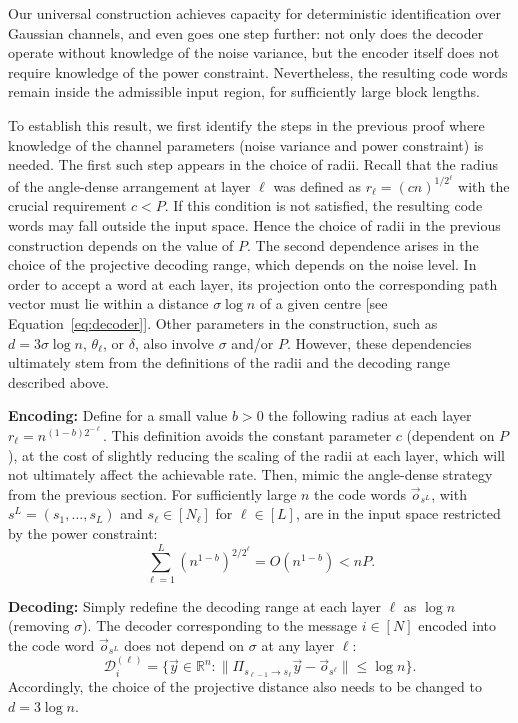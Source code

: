 \documentclass[10pt,conference]{IEEEtran}
\newcommand{\1}{\mathds{1}}
\newcommand{\RR}{\mathbb{R}}
\newcommand{\cD}{\mathcal{D}}
\begin{document}
Our universal construction achieves capacity for deterministic identification over Gaussian channels, and even goes one step further: not only does the decoder operate without knowledge of the noise variance, but the encoder itself does not require knowledge of the power constraint. Nevertheless, the resulting code words remain inside the admissible input region, for sufficiently large block lengths. 

To establish this result, we first identify the steps in the previous proof where knowledge of the channel parameters (noise variance and power constraint) is needed. The first such step appears in the choice of radii. Recall that the radius of the angle-dense arrangement at layer $\ell$ was defined as $r_\ell=(cn)^{1/2^\ell}$ with the crucial requirement $c<P$. If this condition is not satisfied, the resulting code words may fall outside the input space. Hence the choice of radii in the previous construction depends on the value of $P$. The second dependence arises in the choice of the projective decoding range, which depends on the noise level. In order to accept a word at each layer, its projection onto the corresponding path vector must lie within a distance $\sigma \log n$ of a given centre [see Equation~\eqref{eq:decoder}]. Other parameters in the construction, such as $d=3\sigma\log n$, $\theta_\ell$, or $\delta$, also involve $\sigma$ and/or $P$. However, these dependencies ultimately stem from the definitions of the radii and the decoding range described above. 

\noindent \textbf{Encoding:}
Define for a small value $b>0$ the following radius at each layer $r_\ell=n^{(1-b)2^{-\ell}}$. This definition avoids the constant parameter $c$ (dependent on $P$), at the cost of slightly reducing the scaling of the radii at each layer, which will not ultimately affect the achievable rate. Then, mimic the angle-dense strategy from the previous section. For sufficiently large $n$ the code words $\vec o_{s^L}$, with $s^L=(s_1,\dots,s_L)$ and $s_\ell\in [N_\ell]$ for $\ell\in[L]$, are in the input space restricted by the power constraint:
\begin{equation}\label{eq:uni_radi}
\sum_{\ell=1}^{L}(n^{1-b})^{2/2^\ell}=O(n^{1-b})<nP.
\end{equation}

\noindent \textbf{Decoding:}
Simply redefine the decoding range at each layer $\ell$ as $\log n$ (removing $\sigma$). The decoder corresponding to the message $i\in[N]$ encoded into the code word $\vec o_{s^L}$ does not depend on $\sigma$ at any layer $\ell$:
\begin{equation}\label{eq:uni_decoder}
\cD_{i}^{(\ell)}=\{\vec{y}\in\RR^n:\|\Pi_{s_{\ell-1}\to s_{\ell}}\vec{y}-\vec{o}_{s^\ell}\|\leq\log n\}.
\end{equation}
Accordingly, the choice of the projective distance also needs to be changed to $d=3\log n$. 
\medskip
\end{document}

